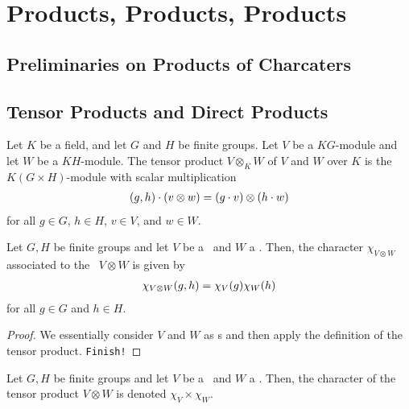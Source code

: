 \section{Products, Products, Products}

\subsection{Preliminaries on Products of Charcaters}


\subsection{Tensor Products and Direct Products}

\begin{boxdefinition}
    Let $K$ be a field, and let $G$ and $H$ be finite groups. Let $V$ be a $KG$-module and let $W$ be a $KH$-module. The tensor product $V \otimes_K W$ of $V$ and $W$ over $K$ is the $K(G \times H)$-module with scalar multiplication
    \begin{align}
        \left( g, h \right) \cdot \left( v \otimes w \right) = \left( g \cdot v \right) \otimes \left( h \cdot w \right)
    \end{align}
    for all $g \in G$, $h \in H$, $v \in V$, and $w \in W$.
\end{boxdefinition}

\begin{proposition}
    Let $G, H$ be finite groups and let $V$ be a \CGM\ and $W$ a \CHM. Then, the character $\chi_{V \otimes W}$ associated to the \CGHM\ $V \otimes W$ is given by
    \begin{align*}
        \chi_{V \otimes W}\!\left( g, h \right) = \chi_V(g) \chi_W(h)
    \end{align*}
    for all $g \in G$ and $h \in H$.
\end{proposition}
\begin{proof}
    We essentially consider $V$ and $W$ as \CGHM s and then apply the definition of the tensor product. \verb|Finish!|
\end{proof}

\begin{boxnotation}
    Let $G, H$ be finite groups and let $V$ be a \CGM\ and $W$ a \CHM. Then, the character of the tensor product $V \otimes W$ is denoted $\chi_V \times \chi_W$.
\end{boxnotation}

